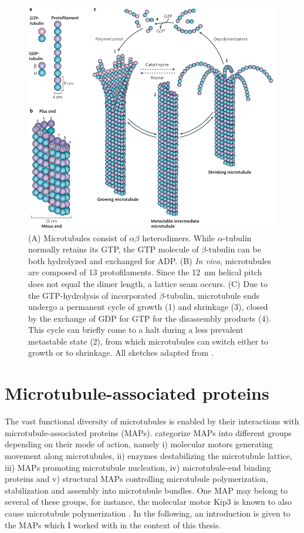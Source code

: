 \begin{figure}[h!tb]
\centering
\includegraphics[scale=0.65]{Figures/MTintro.png}
\caption[Introduction to microtubules.]{
(A) Microtubules consist of $\alpha\beta$ heterodimers. While $\alpha$-tubulin normally retains its GTP, the GTP molecule of $\beta$-tubulin can be both hydrolyzed and exchanged for ADP. (B) \textit{In vivo}, microtubules are composed of 13 protofilaments. Since the \SI{12}{\nm} helical pitch does not equal the dimer length, a lattice seam occurs. (C) Due to the GTP-hydrolysis of incorporated $\beta$-tubulin, microtubule ends undergo a permanent cycle of growth (1) and shrinkage (3), closed by the exchange of GDP for GTP for the disassembly products (4). This cycle can briefly come to a halt during a less prevalent metastable state (2), from which microtubules can switch either to growth or to shrinkage. All sketches adapted from \cite{Akhmanova2008}.
	}\label{MTintro}
\end{figure}
 \FloatBarrier

\section{Microtubule-associated proteins}
\label{sec:MAPs}
The vast functional diversity of microtubules is enabled by their interactions with microtubule-associated proteins (MAPs). \cite{BODAKUNTLA2019804} categorize MAPs into different groups depending on their mode of action, namely i) molecular motors generating movement along microtubules, ii) enzymes destabilizing the microtubule lattice, iii) MAPs promoting microtubule nucleation, iv) microtubule-end binding proteins and v) structural MAPs controlling microtubule polymerization, stabilization and assembly into microtubule bundles. One MAP may belong to several of these groups, for instance, the molecular motor Kip3 is known to also cause microtubule polymerization \parencite{Gardner2011a}. In the following, an introduction is given to the MAPs which I worked with in the context of this thesis.

